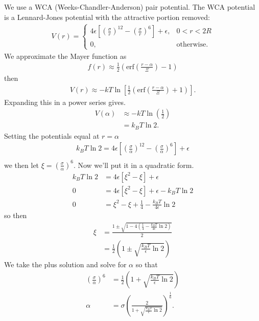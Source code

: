 \documentclass[letterpaper,twocolumn,amsmath,amssymb,prb]{revtex4-1}
\begin{document}
We use a WCA (Weeks-Chandler-Anderson) pair potential. The WCA
potential is a Lennard-Jones potential with the attractive portion removed:
\begin{align}
  V(r) =
  \begin{cases}
    4\epsilon \left[ \left(\frac{\sigma}{r}\right)^{12} -
    \left(\frac{\sigma}{r}\right)^{6} \right] + \epsilon, & 0 < r < 2R \\
    0, & \textrm{otherwise}.
  \end{cases}
\end{align}
We approximate the Mayer function as
\begin{align}
  f(r) \approx \tfrac12 \left( \mathrm{erf}\left( \frac{r - \alpha}{\Xi} \right) - 1 \right)
\end{align}
then
\begin{align}
  V(r) \approx -kT\ln\left[\tfrac12 \left( \mathrm{erf}\left( \frac{r -
    \alpha}{\Xi} \right) + 1 \right) \right].
\end{align}
Expanding this in a power series gives.
\begin{align}
  V(\alpha) &\approx -kT\ln\left(\tfrac12\right) \\
  &= k_BT \ln 2.
\end{align}
Setting the potentials equal at $r=\alpha$
\begin{align}
  k_BT \ln 2 = 4\epsilon \left[ \left(\frac{\sigma}{\alpha}\right)^{12} -
    \left(\frac{\sigma}{\alpha}\right)^{6} \right] + \epsilon \\
\end{align}
we then let $\xi = \left(\frac{\sigma}{\alpha}\right)^6$. Now we'll put it in a
quadratic form.
\begin{align}
  k_BT \ln 2 &= 4\epsilon \left[ \xi^2 - \xi  \right] + \epsilon \\
  0 &= 4\epsilon \left[ \xi^2 - \xi  \right] + \epsilon - k_BT \ln 2 \\
  0 &= \xi^2 - \xi + \frac{1}{4} - \frac{k_BT}{4\epsilon} \ln 2
\end{align}
so then
\begin{align}
  \xi &= \frac{1\pm \sqrt{1-4 \left( \frac{1}{4} -  \frac{k_BT}{4\epsilon}
    \ln 2 \right)}}{2} \\
  &= \frac{1}{2}\left(1 \pm \sqrt{ \frac{k_BT}{\epsilon} \ln 2} \right)
\end{align}
We take the plus solution and solve for $\alpha$ so that
\begin{align}
  \left(\frac{\sigma}{\alpha}\right)^6 &= \frac{1}{2}\left(1 +
  \sqrt{\frac{k_BT}{\epsilon} \ln 2} \right) \\
  \alpha &= \sigma \left( \frac{2}{1 + \sqrt{\frac{k_BT}{\epsilon}
        \ln 2}} \right)^{\frac{1}{6}}.
\end{align}
\end{document}
